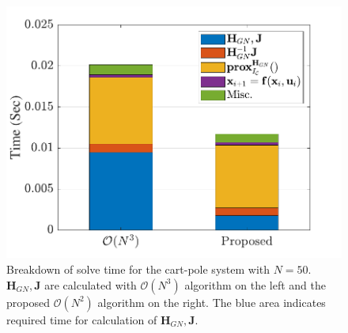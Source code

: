 
\begin{figure}
	\centering
	\includegraphics[width=0.7\columnwidth]{Figures/O2O3_bar.pdf}
	\caption{Breakdown of solve time for the cart-pole system with $N=50$. $\mathbf{H}_{GN}, \mathbf{J}$ are calculated with $\mathcal{O}(N^3)$ algorithm on the left and the proposed $\mathcal{O}(N^2)$ algorithm on the right. The blue area indicates required time for calculation of $\mathbf{H}_{GN}, \mathbf{J}$. }
	\label{fig:H_O2O3_bar}
\end{figure}


